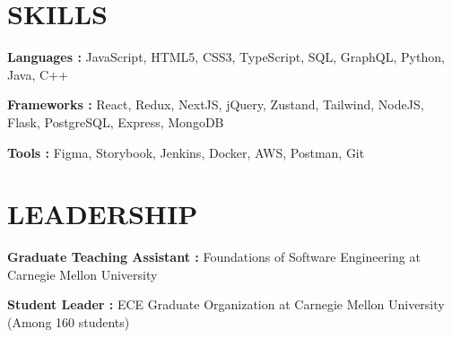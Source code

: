 \documentclass[letterpaper]{article}
\makeatletter
\newcommand{\resumeItemWithoutTitle}[1]{
  \item{
    {#1 \vspace{-4pt}}
  }
}
\newcommand{\shortSection}[1]{
    \vspace{-6pt}
    \section{#1}
}
\newcommand{\projectHeading}[4]{
  \begin{tabular*}{\textwidth}{l@{\extracolsep{\fill}}r}
        \textbf{#1} 
        \hspace{-2pt} $\vert$ \hspace{-2pt} {\textit{#2}} 
        \hspace{-2pt} $\vert$ \hspace{-2pt} \href{#3}{ \underline{Link}}
        &
        \textit{#4} \\
    \end{tabular*}\vspace{-2pt}
}
\newcommand{\projectHeadingWithoutLink}[3]{
  \begin{tabular*}{\textwidth}{l@{\extracolsep{\fill}}r}
        \textbf{#1} 
        \hspace{-2pt} $\vert$ \hspace{-2pt} {\textit{#2}}
        & 
        \textit{#3} \\
    \end{tabular*}\vspace{-2pt}
}
\newcommand*{\skill}[2]{
  \textbf{#1 : }#2 \\
  \vspace{1pt}
}
\newcommand{\resumeItemListStart}{\begin{itemize}}
\newcommand{\resumeItemListEnd}{\end{itemize}}
\makeatother
\begin{document}





\shortSection{SKILLS}
\skill {Languages\hspace{8pt}}{JavaScript, HTML5, CSS3, TypeScript, SQL, GraphQL, Python, Java, C++}
\skill {Frameworks}{React, Redux, NextJS, jQuery, Zustand, Tailwind, NodeJS, Flask, PostgreSQL, Express, MongoDB}
\skill {Tools\hspace{34pt}}{Figma, Storybook, Jenkins, Docker, AWS, Postman, Git}



\shortSection{LEADERSHIP}
\skill{Graduate Teaching Assistant}{Foundations of Software Engineering at Carnegie Mellon University}
\skill{Student Leader}{ECE Graduate Organization at Carnegie Mellon University (Among 160 students)}
\end{document}
